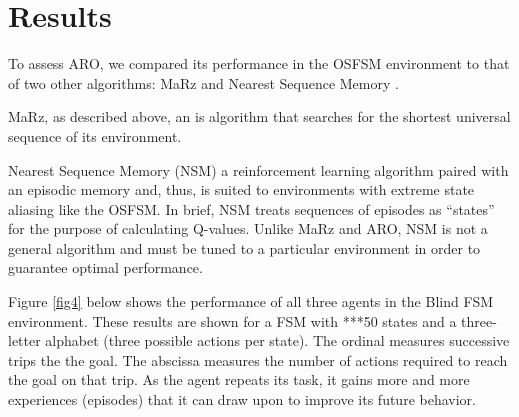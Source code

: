 \documentclass[letterpaper]{article} %
\begin{document}


\section{Results}

To assess ARO, we compared its performance in the OSFSM environment to
that of two other algorithms: MaRz \cite{Rodriguez17} and Nearest
Sequence Memory \cite{McCallum95}.

MaRz, as described above, an is algorithm that searches for the
shortest universal sequence of its environment.

Nearest Sequence Memory (NSM) a reinforcement learning algorithm
paired with an episodic memory and, thus, is suited to environments
with extreme state aliasing like the OSFSM.  In brief, NSM treats
sequences of episodes as ``states'' for the purpose of calculating
Q-values.  Unlike MaRz and ARO, NSM is not a general algorithm and
must be tuned to a particular environment in order to guarantee
optimal performance.

Figure \ref{fig4} below shows the performance of all three agents in
the Blind FSM environment.  These results are shown for a FSM with
***50 states and a three-letter alphabet (three possible actions per
state).  The ordinal measures successive trips the the goal.  The
abscissa measures the number of actions required to reach the goal on
that trip.  As the agent repeats its task, it gains more and more
experiences (episodes) that it can draw upon to improve its future
behavior.
\end{document}
